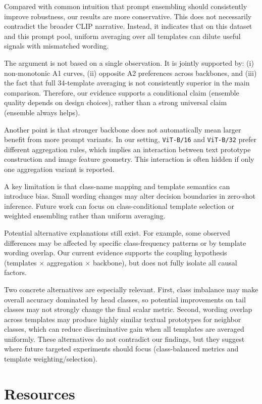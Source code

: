 \documentclass[11pt]{article}
\begin{document}
Compared with common intuition that prompt ensembling should consistently improve robustness,
our results are more conservative.
This does not necessarily contradict the broader CLIP narrative.
Instead, it indicates that on this dataset and this prompt pool,
uniform averaging over all templates can dilute useful signals with mismatched wording.

The argument is not based on a single observation.
It is jointly supported by: (i) non-monotonic A1 curves, (ii) opposite A2 preferences across backbones,
and (iii) the fact that full 34-template averaging is not consistently superior in the main comparison.
Therefore, our evidence supports a conditional claim (ensemble quality depends on design choices),
rather than a strong universal claim (ensemble always helps).

Another point is that stronger backbone does not automatically mean larger benefit from more prompt variants.
In our setting, \texttt{ViT-B/16} and \texttt{ViT-B/32} prefer different aggregation rules,
which implies an interaction between text prototype construction and image feature geometry.
This interaction is often hidden if only one aggregation variant is reported.

A key limitation is that class-name mapping and template semantics can introduce bias.
Small wording changes may alter decision boundaries in zero-shot inference.
Future work can focus on class-conditional template selection or weighted ensembling rather than uniform averaging.

Potential alternative explanations still exist.
For example, some observed differences may be affected by specific class-frequency patterns or by template wording overlap.
Our current evidence supports the coupling hypothesis (templates $\times$ aggregation $\times$ backbone),
but does not fully isolate all causal factors.

Two concrete alternatives are especially relevant.
First, class imbalance may make overall accuracy dominated by head classes,
so potential improvements on tail classes may not strongly change the final scalar metric.
Second, wording overlap across templates may produce highly similar textual prototypes for neighbor classes,
which can reduce discriminative gain when all templates are averaged uniformly.
These alternatives do not contradict our findings,
but they suggest where future targeted experiments should focus (class-balanced metrics and template weighting/selection).

\section{Resources}
\end{document}
